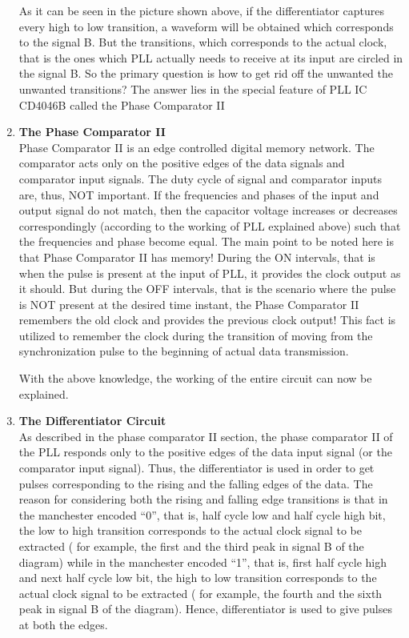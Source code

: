 \documentclass{article}
\begin{document}
\begin{enumerate}[label=(\Alph*)]
\begin{figure}[h]
\end{figure}

As it can be seen in the picture shown above, if the differentiator captures every high to low transition, a waveform will be obtained which corresponds to the signal B. But the transitions, which corresponds to the actual clock, that is the ones which PLL actually needs to receive at its input are circled in the signal B. So the primary question is how to get rid off the unwanted the unwanted transitions?  
The answer lies in the special feature of PLL IC CD4046B called the Phase Comparator II

\item \textbf{The Phase Comparator II}\\
  Phase Comparator II is an edge controlled digital memory network. The comparator acts only on the positive edges of the data signals and comparator input signals. The duty cycle of signal and comparator inputs are, thus, NOT important. If the frequencies and phases of the input and output signal do not match, then the capacitor voltage increases or decreases correspondingly (according to the working of PLL explained above) such that the frequencies and phase become equal. The main point to be noted here is that Phase Comparator II has memory! During the ON intervals, that is when the pulse is present at the input of PLL, it provides the clock output as it should. But during the OFF intervals, that is the scenario where the pulse is NOT present at the desired time instant, the Phase Comparator II remembers the old clock and provides the previous clock output! This fact is utilized to remember the clock during the transition of moving from the synchronization pulse to the beginning of actual data transmission.

With the above knowledge, the working of the entire circuit can now be explained.


\item \textbf{The Differentiator Circuit}\\
  As described in the phase comparator II section, the phase comparator II of the PLL responds only to the positive edges of the data input signal (or the comparator input signal). Thus, the differentiator is used in order to get pulses corresponding to the rising and the falling edges of the data. The reason for considering both the rising and falling edge transitions is that in the manchester encoded “0”, that is, half cycle low and half cycle high bit, the low to high transition corresponds to the actual clock signal to be extracted ( for example, the first and the third peak in signal B of the diagram) while in the manchester encoded “1”, that is, first half cycle high and next half cycle low bit, the high to low transition corresponds to the actual clock signal to be extracted ( for example, the fourth and the sixth peak in signal B of the diagram). Hence, differentiator is used to give pulses at both the edges.


\end{enumerate}
\end{document}
